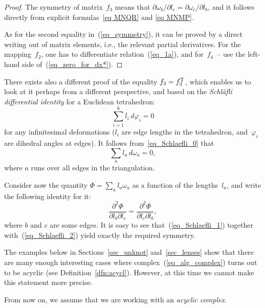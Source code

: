 \begin{proof} The symmetry of matrix~$f_3$ means that $\partial \omega_b / \partial l_c = \partial \omega_c / \partial l_b$, and it follows directly from explicit formulas~\eqref{eq MNQR} and \eqref{eq MNMP}.

As for the second equality in~(\ref{eq_symmetry}), it can be proved by a direct writing out of matrix elements, i.e., the relevant partial derivatives. For the mapping~$f_2$, one has to dif\/ferentiate relation~(\ref{eq_1a}), and for~$f_4$~-- use the left-hand side of~(\ref{eq_zero_for_dx*}).
\end{proof}

\begin{remark}
There exists also a dif\/ferent proof of the equality $f_3 = f_3^{\rm T}$, which enables us to look at it perhaps from a dif\/ferent perspective, and based on the \emph{Schl\"afli differential identity} for a Euclidean tetrahedron:
\begin{equation}
\sum_{i=1}^6 l_i \, d\varphi_i = 0
\label{eq_Schlaefli_0}
\end{equation}
for any inf\/initesimal deformations ($l_i$ are edge lengths in the tetrahedron, and~$\varphi_i$ are dihedral angles at edges). It follows from~\eqref{eq_Schlaefli_0} that
\begin{equation}
\sum_a l_a \, d\omega_a = 0,
\label{eq_Schlaefli_1}
\end{equation}
where $a$ runs over all edges in the triangulation.

Consider now the quantity $\Phi=\sum_a l_a \omega_a$ as a function of the lengths~$l_a$, and write the following identity for it:
\begin{equation}
\frac{\partial^2 \Phi}{\partial l_b \partial l_c} = \frac{\partial^2 \Phi}{\partial l_c \partial l_b},
\label{eq_Schlaefli_2}
\end{equation}
where $b$ and $c$ are some edges. It is easy to see that~(\ref{eq_Schlaefli_1}) together with~(\ref{eq_Schlaefli_2}) yield exactly the required symmetry.
\end{remark}

The examples below in Sections~\ref{sec_unknot} and~\ref{sec_lenses} show that there are many enough interesting cases where complex~(\ref{eq_alg_complex}) turns out to be acyclic (see Def\/inition~\ref{dfn:acycl}). However, at this time we cannot make this statement more precise.

\begin{convention}
\label{conv3}
From now on, we assume that we are working with an \emph{acyclic complex}.
\end{convention}


